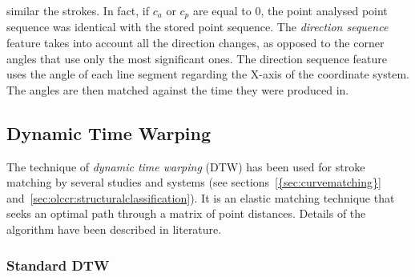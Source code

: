 similar the strokes. In fact, if \( c_a \) or \( c_p \) are equal to \(0\),
the point analysed point sequence was identical with the stored point sequence.
The \emph{direction sequence} feature takes into account all the direction 
changes, as opposed to the corner angles that use only the most significant ones.
The direction sequence feature uses the angle of each line segment regarding the 
X-axis of the coordinate system. The angles are then matched against the time
they were produced in.
%

\subsection{Dynamic Time Warping}
\label{sec:hwre:dynamictimewarping}

The technique of \emph{dynamic time warping} (DTW) has been used for stroke 
matching by several studies and systems (see sections~\ref{{sec:curvematching}} 
and~\ref{sec:olccr:structuralclassification}).
It is an elastic matching technique that seeks an optimal path through
a matrix of point distances. Details of the algorithm have been described
in literature.

\subsubsection{Standard DTW}
\label{sec:hwre:standarddtw}

